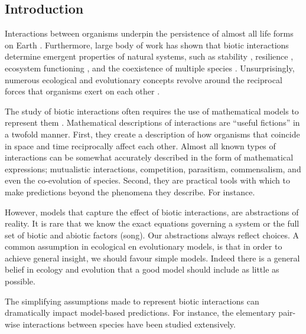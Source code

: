 \begin{refsection}
\chapter{Introduction} %
\label{Intro}

Interactions between organisms underpin the persistence of almost all life forms on Earth \citep{lawton1999there}. Furthermore, large body of work has shown that biotic interactions determine emergent properties of natural systems, such as stability \citep{may1972will, wootton2016many,song2018will}, resilience \citep{capdevila2021reconciling}, ecosystem functioning \citep{turnbull2013coexistence,godoy2020excess}, and the coexistence of multiple species \citep{chesson2000mechanisms,saavedra2017structural}. Unsurprisingly, numerous ecological and evolutionary concepts revolve around the reciprocal forces that organisms exert on each other \citep{gause_experimental_1934, macarthur1967limiting, hillerislambers2012rethinking,chase2009ecological, thompson1999evolution}.

The study of biotic interactions often requires the use of mathematical models to represent them \citep{maynard1978models}. Mathematical descriptions of interactions are ``useful fictions'' \citep{box2011statistical} in a twofold manner. First, they create a description of how organisms that coincide in space and time reciprocally affect each other. Almost all known types of interactions can be somewhat accurately described in the form of mathematical expressions; mutualistic interactions, competition, parasitism, commensalism, and even the co-evolution of species. Second, they are practical tools with which to make predictions beyond the phenomena they describe. For instance.

However, models that capture the effect of biotic interactions, are abstractions of reality. It is rare that we know the exact equations governing a system or the full set of biotic and abiotic factors (song). Our abstractions always reflect choices.  A common assumption in ecological en evolutionary models, is that in order to achieve general insight, we should favour simple models. Indeed there is a general belief in ecology and evolution that a good model should include as little as possible.


The simplifying assumptions made to represent biotic interactions can dramatically impact model-based predictions. For instance, the elementary pair-wise interactions between species have been studied extensively.


\end{refsection}
